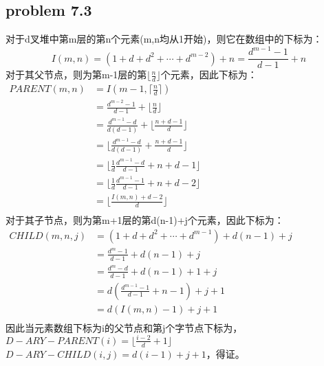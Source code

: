 \documentclass[11pt]{ctexart}
\begin{document}
	\subsection*{problem 7.3}
	对于d叉堆中第m层的第n个元素(m,n均从1开始)，则它在数组中的下标为：
	$$I(m,n)=(1+d+d^2+\cdots+d^{m-2})+n=\frac{d^{m-1}-1}{d-1}+n$$
	对于其父节点，则为第m-1层的第$\lfloor\frac{n}{d}\rfloor$个元素，因此下标为：\\
	$
	\begin{aligned}
	PARENT(m,n)&=I(m-1,\lceil\frac{n}{d}\rceil)\\
	&=\frac{d^{m-2}-1}{d-1}+\lfloor\frac{n}{d}\rfloor\\
	&=\frac{d^{m-1}-d}{d(d-1)}+\lfloor\frac{n+d-1}{d}\rfloor\\
	&=\lfloor\frac{d^{m-1}-d}{d(d-1)}+\frac{n+d-1}{d}\rfloor\\
	&=\lfloor\frac{1}{d}\frac{d^{m-1}-d}{d-1}+n+d-1\rfloor\\
	&=\lfloor\frac{1}{d}\frac{d^{m-1}-1}{d-1}+n+d-2\rfloor\\
	&=\lfloor\frac{I(m,n)+d-2}{d}\rfloor\\
	\end{aligned}
	$\\
	对于其子节点，则为第m+1层的第d(n-1)+j个元素，因此下标为：\\
	$
	\begin{aligned}
	CHILD(m,n,j)&=(1+d+d^2+\cdots+d^{m-1})+d(n-1)+j\\
	&=\frac{d^m-1}{d-1}+d(n-1)+j\\
	&=\frac{d^{m}-d}{d-1}+d(n-1)+1+j\\
	&=d(\frac{d^{m-1}-1}{d-1}+n-1)+j+1\\
	&=d(I(m,n)-1)+j+1\\
	\end{aligned}
	$\\
	因此当元素数组下标为i的父节点和第j个字节点下标为，\\
	$D-ARY-PARENT(i)=\lfloor\frac{i-2}{d}+1\rfloor$\\
	$D-ARY-CHILD(i,j)=d(i-1)+j+1$，得证。
\end{document}
